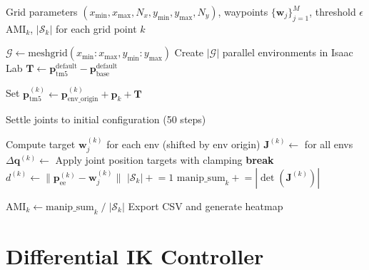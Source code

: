 \documentclass[a4paper,11pt]{article}
\begin{document}
\begin{algorithm}[H]
\caption{Parallel Base Position Optimization}
\label{alg:optimizer}
\begin{algorithmic}[1]
\Require Grid parameters $(x_{\min}, x_{\max}, N_x, y_{\min}, y_{\max}, N_y)$, waypoints $\{\mathbf{w}_j\}_{j=1}^M$, threshold $\epsilon$
\Ensure $\text{AMI}_k$, $|\mathcal{S}_k|$ for each grid point $k$

\State $\mathcal{G} \leftarrow \text{meshgrid}(x_{\min}:x_{\max}, y_{\min}:y_{\max})$
\State Create $|\mathcal{G}|$ parallel environments in Isaac Lab
\State $\mathbf{T} \leftarrow \mathbf{p}_{\text{tm5}}^{\text{default}} - \mathbf{p}_{\text{base}}^{\text{default}}$ 

    \State Set $\mathbf{p}_{\text{tm5}}^{(k)} \leftarrow \mathbf{p}_{\text{env\_origin}}^{(k)} + \mathbf{p}_k + \mathbf{T}$ 
\EndFor

\State {} 
\State Settle joints to initial configuration (50 steps)

    \State Compute target $\mathbf{w}_j^{(k)}$ for each env (shifted by env origin)
        \State $\mathbf{J}^{(k)} \leftarrow$  for all envs
        \State $\Delta\mathbf{q}^{(k)} \leftarrow$ 
        \State Apply joint position targets with clamping
        \State {}
            \State \textbf{break}
        \EndIf
    \EndFor
    \State $d^{(k)} \leftarrow \|\mathbf{p}_{\text{ee}}^{(k)} - \mathbf{w}_j^{(k)}\|$
        \State $|\mathcal{S}_k| \mathrel{+}= 1$
        \State $\text{manip\_sum}_k \mathrel{+}= |\det(\mathbf{J}^{(k)})|$
    \EndIf
\EndFor

\State $\text{AMI}_k \leftarrow \text{manip\_sum}_k \;/\; |\mathcal{S}_k|$ 
\State Export CSV and generate heatmap
\end{algorithmic}
\end{algorithm}

\section{Differential IK Controller}
\end{document}
